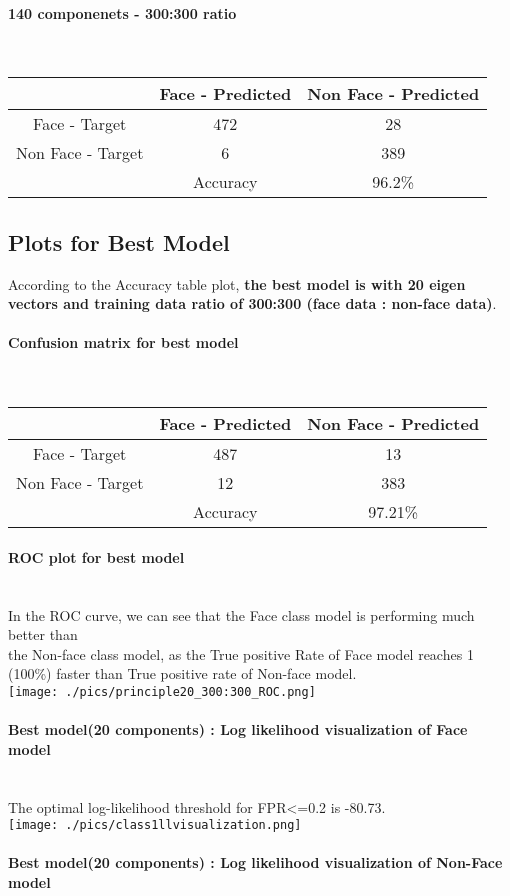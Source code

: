 \documentclass[fleqn]{article}
\newcommand{\myparagraph}[1]{\paragraph{#1}\mbox{}\\}
\begin{document}
\myparagraph{140 componenets - 300:300 ratio}

\begin{center}
  \begin{longtable}{ c | c | c  }
  	\multicolumn{1}{c}{ } & 
	\multicolumn{1}{c}{Face - Predicted } & 
	\multicolumn{1}{c}{Non Face - Predicted } \\
    \hline
 	Face - Target & 472& 28\\ \hline
 	Non Face - Target & 6 &389 \\ 	\hline
 	& Accuracy & 96.2\% \\ \hline
  \end{longtable}
\end{center}

\newpage
\subsection{Plots for Best Model}

According to the Accuracy table plot, \textbf{the best model is with 20 eigen vectors and training data ratio of 300:300 (face data : non-face data)}.\\
\myparagraph{Confusion matrix for best model}
\begin{center}
  \begin{longtable}{ c | c | c  }
  	\multicolumn{1}{c}{ } & 
	\multicolumn{1}{c}{Face - Predicted } & 
	\multicolumn{1}{c}{Non Face - Predicted } \\
    \hline
 	Face - Target & 487& 13\\ \hline
 	Non Face - Target & 12 &383 \\ 	\hline
 	& Accuracy & 97.21\% \\ \hline
  \end{longtable}
\end{center}
\myparagraph{ROC plot for best model}

In the ROC curve, we can see that the Face class model is performing much better than\\ the Non-face class model,
as the True positive Rate of Face model reaches 1 (100\%) faster than True positive rate of Non-face model.\\
\texttt{[image: ./pics/principle20\_300:300\_ROC.png]} \newline
\myparagraph{Best model(20 components) : Log likelihood visualization of Face model}

The optimal log-likelihood threshold for FPR\textless=0.2 is -80.73.\\
\texttt{[image: ./pics/class1llvisualization.png]} \newline
\myparagraph{Best model(20 components) : Log likelihood visualization of Non-Face model}
\end{document}
